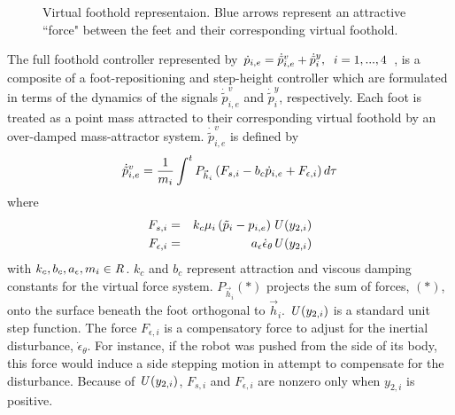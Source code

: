 			\begin{figure}[h!]
				\centering
				\caption{ Virtual foothold representaion. Blue arrows represent an attractive ``force" between the feet and their corresponding virtual foothold.}
				\label{fig::virtial_foothold}
			\end{figure}

		The full foothold controller represented by $\dot{p}_{i,e} = \dot{\tilde{p}}_{i,e}^{v} + \dot{\tilde{p}}_{i}^{y}, \hspace{2mm} i = 1,...,4$ , is a composite of a foot-repositioning and step-height controller which are formulated in terms of the dynamics of the signals $\dot{\tilde{p}}_{i,e}^{v}$ and $\dot{\tilde{p}}_{i}^{y}$, respectively. Each foot is treated as a point mass attracted to their corresponding virtual foothold by an over-damped mass-attractor system. $\dot{\tilde{p}}_{i,e}^{v}$ is defined by
			\begin{equation}
				\label{eq::FootControl}
				\dot{\tilde{p}}_{i,e}^{v} 		= \frac{1}{m_{i}} \int^t{{P}_{\vec{h}_{i}} \left( F_{s,i}  -b_{c} \dot{p}_{i,e} + F_{\epsilon,i} \right) d\tau}
			\end{equation}
		where
			\begin{eqnarray*}
				F_{s,i} 			& = & k_{c}  \mu_{i} \left( \tilde{p}_{i} - {p}_{i,e} \right) \emph{U}\left(y_{2,i}\right)		\nonumber\\
				F_{\epsilon,i}		& = & a_{\epsilon}\dot{\epsilon}_{\theta} \emph{U}\left(y_{2,i}\right)						\nonumber
			\end{eqnarray*}
	 	with $k_{c},b_{c},a_{\epsilon},m_{i} \in\emph{R}^{}$.
		$k_{c}$ and $b_{c}$ represent  attraction and viscous damping constants for the virtual force system. ${P}_{\vec{h}_{i}}(*)$ projects the sum of  forces, $(*)$, onto the surface beneath the \Ith foot orthogonal to $\vec{h}_{i}$. $\emph{U}\left(y_{2,i}\right)$ is a standard unit step function. The force $F_{\epsilon,i}$ is a compensatory force to adjust for the inertial disturbance,  $\dot{\epsilon}_{\theta}$. For instance, if the robot was pushed from the side of its body, this force would induce a side stepping motion in attempt to compensate for the disturbance. Because of $\emph{U}\left(y_{2,i}\right)$, $F_{s,i}$ and $F_{\epsilon,i}$ are nonzero only when $y_{2,i}$ is positive.


